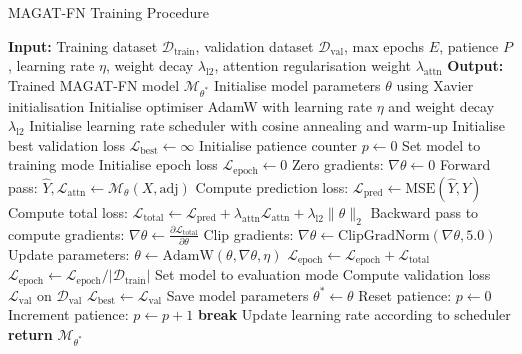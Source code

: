 \documentclass[lettersize, journal]{IEEEtran}
\begin{document}
\begin{algorithm}[h]
\caption{MAGAT-FN Training Procedure}
\label{alg:training}
\begin{algorithmic}[1]
\STATE \textbf{Input:} Training dataset $\mathcal{D}_{\text{train}}$, validation dataset $\mathcal{D}_{\text{val}}$, max epochs $E$, patience $P$, learning rate $\eta$, weight decay $\lambda_{\text{l2}}$, attention regularisation weight $\lambda_{\text{attn}}$
\STATE \textbf{Output:} Trained MAGAT-FN model $\mathcal{M}_{\theta^*}$
\STATE Initialise model parameters $\theta$ using Xavier initialisation
\STATE Initialise optimiser AdamW with learning rate $\eta$ and weight decay $\lambda_{\text{l2}}$
\STATE Initialise learning rate scheduler with cosine annealing and warm-up
\STATE Initialise best validation loss $\mathcal{L}_{\text{best}} \leftarrow \infty$
\STATE Initialise patience counter $p \leftarrow 0$
    \STATE Set model to training mode
    \STATE Initialise epoch loss $\mathcal{L}_{\text{epoch}} \leftarrow 0$
        \STATE Zero gradients: $\nabla\theta \leftarrow 0$
        \STATE Forward pass: $\hat{Y}, \mathcal{L}_{\text{attn}} \leftarrow \mathcal{M}_{\theta}(X, \text{adj})$
        \STATE Compute prediction loss: $\mathcal{L}_{\text{pred}} \leftarrow \text{MSE}(\hat{Y}, Y)$
        \STATE Compute total loss: $\mathcal{L}_{\text{total}} \leftarrow \mathcal{L}_{\text{pred}} + \lambda_{\text{attn}}\mathcal{L}_{\text{attn}} + \lambda_{\text{l2}}\|\theta\|_2$
        \STATE Backward pass to compute gradients: $\nabla\theta \leftarrow \frac{\partial\mathcal{L}_{\text{total}}}{\partial\theta}$
        \STATE Clip gradients: $\nabla\theta \leftarrow \text{ClipGradNorm}(\nabla\theta, 5.0)$
        \STATE Update parameters: $\theta \leftarrow \text{AdamW}(\theta, \nabla\theta, \eta)$
        \STATE $\mathcal{L}_{\text{epoch}} \leftarrow \mathcal{L}_{\text{epoch}} + \mathcal{L}_{\text{total}}$
    \ENDFOR
    \STATE $\mathcal{L}_{\text{epoch}} \leftarrow \mathcal{L}_{\text{epoch}} / |\mathcal{D}_{\text{train}}|$
    \STATE Set model to evaluation mode
    \STATE Compute validation loss $\mathcal{L}_{\text{val}}$ on $\mathcal{D}_{\text{val}}$
        \STATE $\mathcal{L}_{\text{best}} \leftarrow \mathcal{L}_{\text{val}}$
        \STATE Save model parameters $\theta^* \leftarrow \theta$
        \STATE Reset patience: $p \leftarrow 0$
    \ELSE
        \STATE Increment patience: $p \leftarrow p + 1$
            \STATE \textbf{break} 
        \ENDIF
    \ENDIF
    \STATE Update learning rate according to scheduler
\ENDFOR
\STATE \textbf{return} $\mathcal{M}_{\theta^*}$
\end{algorithmic}
\end{algorithm}
\end{document}
